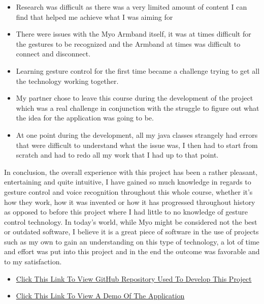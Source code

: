 \documentclass{article}
\begin{document}
\begin{itemize}
    \item Research was difficult as there was a very limited amount of content I can find that helped me achieve what I was aiming for
    \item There were issues with the Myo Armband itself, it was at times difficult for the gestures to be recognized and the Armband at times was difficult to connect and disconnect.
    \item Learning gesture control for the first time became a challenge trying to get all the technology working together.
    \item My partner chose to leave this course during the development of the project which was a real challenge in conjunction with the struggle to figure out what the idea for the application was going to be.
    \item At one point during the development, all my java classes strangely had errors that were difficult to understand what the issue was, I then had to start from scratch and had to redo all my work that I had up to that point.
\end{itemize}
In conclusion, the overall experience with this project has been a rather pleasant, entertaining and quite intuitive, I have gained so much knowledge in regards to gesture control and voice recognition throughout this whole course, whether it's how they work, how it was invented or how it has progressed throughout history as opposed to before this project where I had little to no knowledge of gesture control technology. In today's world, while Myo might be considered not the best or outdated software, I believe it is a great piece of software in the use of projects such as my own to gain an understanding on this type of technology, a lot of time and effort was put into this project and in the end the outcome was favorable and to my satisfaction.

\begin{appendices}
\begin{itemize}
\item \href{https://github.com/Emmanuel-Osabuehien/GestureBasedUIProject}{Click This Link To View GitHub Repository Used To Develop This Project}
\item \href{https://www.youtube.com/channel/UCPuj1Jh_EBjMLajzBtHOukA}{Click This Link To View A Demo Of The Application}
\end{itemize}
\end{appendices}

\printbibliography
\end{document}
